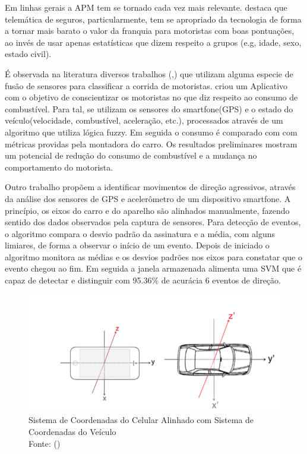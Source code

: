 Em linhas gerais a APM tem se tornado cada vez mais relevante. \citeauthor{junior2017driver} \cite{junior2017driver} destaca que telemática de seguros, particularmente, tem se apropriado da tecnologia de forma a  tornar mais barato o valor da franquia para motoristas com boas pontuações, ao invés de usar apenas estatísticas que dizem respeito a grupos (e.g, idade, sexo, estado civil).

É observada na literatura diversos trabalhos (\cite{Paefgen:2012:DBA:2406367.2406412},\cite{eren2012estimating}) que utilizam alguma especie de fusão de sensores para classificar a corrida de motoristas. \citeauthor{araujo2012driving} criou um Aplicativo com o objetivo de conscientizar os motoristas no que diz respeito ao consumo de combustível. Para tal, se utilizam os sensores do smartfone(GPS) e o estado do veículo(velocidade, combustível, aceleração, etc.), processados através de um algoritmo que utiliza lógica fuzzy. Em seguida o consumo é comparado com com métricas providas pela montadora do carro. Os resultados preliminares mostram um potencial de redução do consumo de combustível e a mudança no comportamento do motorista.

Outro trabalho \citep{chen2015d} propõem a identificar movimentos de direção agressivos, através da análise dos sensores de GPS e acelerômetro de um dispositivo smartfone. A princípio, os eixos do carro e do aparelho são alinhados manualmente, fazendo sentido dos dados observados pela captura de sensores. Para detecção de eventos, o algoritmo compara o desvio padrão da assinatura e a média, com alguns limiares, de forma a observar o início de um evento. Depois de iniciado o algoritmo monitora as médias e os desvios padrões nos eixos para constatar que o evento chegou ao fim. Em seguida a janela armazenada alimenta uma SVM que é capaz de detectar e distinguir com 95.36\% de acurácia 6 eventos de direção.

\begin{figure}
    \centering
    \includegraphics[width = 150mm]{Figuras/celularcarro.PNG}
    \caption{Sistema de Coordenadas do Celular Alinhado com Sistema de Coordenadas do Veículo\\Fonte: \citeauthor{vlahogianni2017driving} (\citeyear{vlahogianni2017driving})}
    \label{fig:celularCarroAlinhados}
\end{figure}{}


